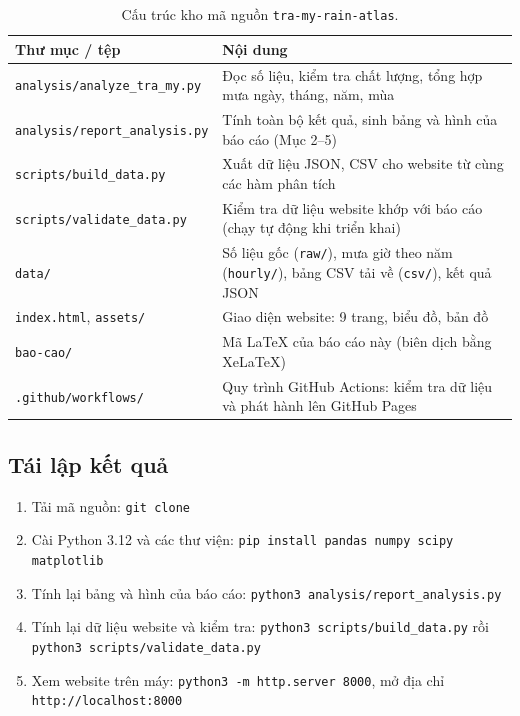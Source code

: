 \begin{table}[H]
  \centering
  \caption{Cấu trúc kho mã nguồn \texttt{tra-my-rain-atlas}.}
  \label{tab:repo}
  \small
  \begin{tabularx}{\linewidth}{|>{\raggedright\arraybackslash}p{5cm}|L|}
    \hline
    \textbf{Thư mục / tệp} & \textbf{Nội dung} \\
    \hline
    \texttt{analysis/analyze\_tra\_my.py} & Đọc số liệu, kiểm tra chất lượng, tổng hợp mưa ngày, tháng, năm, mùa \\ \hline
    \texttt{analysis/report\_analysis.py} & Tính toàn bộ kết quả, sinh bảng và hình của báo cáo (Mục 2--5) \\ \hline
    \texttt{scripts/build\_data.py} & Xuất dữ liệu JSON, CSV cho website từ cùng các hàm phân tích \\ \hline
    \texttt{scripts/validate\_data.py} & Kiểm tra dữ liệu website khớp với báo cáo (chạy tự động khi triển khai) \\ \hline
    \texttt{data/} & Số liệu gốc (\texttt{raw/}), mưa giờ theo năm (\texttt{hourly/}), bảng CSV tải về (\texttt{csv/}), kết quả JSON \\ \hline
    \texttt{index.html}, \texttt{assets/} & Giao diện website: 9 trang, biểu đồ, bản đồ \\ \hline
    \texttt{bao-cao/} & Mã LaTeX của báo cáo này (biên dịch bằng XeLaTeX) \\ \hline
    \texttt{.github/workflows/} & Quy trình GitHub Actions: kiểm tra dữ liệu và phát hành lên GitHub Pages \\ \hline
  \end{tabularx}
\end{table}

\subsection*{Tái lập kết quả}

\begin{enumerate}[label=\arabic*., leftmargin=1.2cm]
  \item Tải mã nguồn: \texttt{git clone \LinkGitHub}
  \item Cài Python 3.12 và các thư viện: \texttt{pip install pandas numpy scipy matplotlib}
  \item Tính lại bảng và hình của báo cáo: \texttt{python3 analysis/report\_analysis.py}
  \item Tính lại dữ liệu website và kiểm tra: \texttt{python3 scripts/build\_data.py} rồi \texttt{python3 scripts/validate\_data.py}
  \item Xem website trên máy: \texttt{python3 -m http.server 8000}, mở địa chỉ \texttt{http://localhost:8000}
\end{enumerate}
